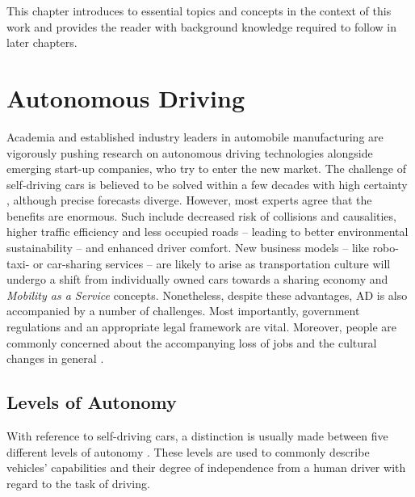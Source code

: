 This chapter introduces to essential topics and concepts in the context of this work and provides the reader with background knowledge required to follow in later chapters.

\section{Autonomous Driving}
\label{sec:background:autonomous_driving}
Academia and established industry leaders in automobile manufacturing are vigorously pushing research on autonomous driving technologies alongside emerging start-up companies, who try to enter the new market. The challenge of self-driving cars is believed to be solved within a few decades with high certainty \cite{Frost&SulivanConsulting2018}, although precise forecasts diverge. However, most experts agree that the benefits are enormous. Such include decreased risk of collisions and causalities, higher traffic efficiency and less occupied roads – leading to better environmental sustainability – and enhanced driver comfort. New business models – like robo-taxi- or car-sharing services – are likely to arise as transportation culture will undergo a shift from individually owned cars towards a sharing economy and \textit{Mobility as a Service} concepts. Nonetheless, despite these advantages, AD is also accompanied by a number of challenges. Most importantly, government regulations and an appropriate legal framework are vital. Moreover, people are commonly concerned about the accompanying loss of jobs and the cultural changes in general \cite{schoettle2014survey}. 

\subsection{Levels of Autonomy}
\label{subsec:background:labels_of_autonomy}
With reference to self-driving cars, a distinction is usually made between five different levels of autonomy \cite{Klein}. These levels are used to commonly describe vehicles' capabilities and their degree of independence from a human driver with regard to the task of driving. 

